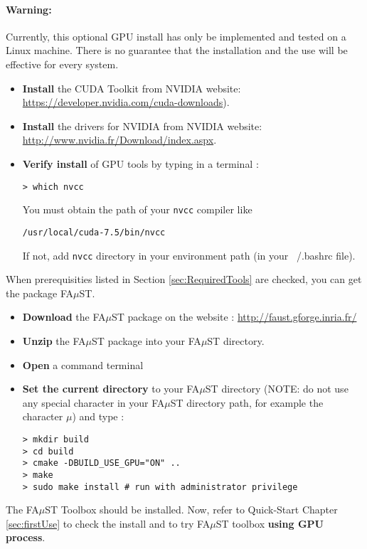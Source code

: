 \paragraph{Warning:} Currently, this optional GPU install has only be implemented and tested on a Linux machine. There is no guarantee that the installation and the use will be effective for every system.

\begin{itemize}
\item \textbf{Install} the CUDA Toolkit from NVIDIA website:\\
\url{https://developer.nvidia.com/cuda-downloads}).
\item \textbf{Install} the drivers for NVIDIA from NVIDIA website:\\ \url{http://www.nvidia.fr/Download/index.aspx}.
\item \textbf{Verify install} of GPU tools by typing in a terminal :
\lstset{style=customBash} 
\begin{lstlisting}
> which nvcc
\end{lstlisting}
You must obtain the path of your \texttt{nvcc} compiler like 
\begin{lstlisting}
/usr/local/cuda-7.5/bin/nvcc
\end{lstlisting}
If not, add \texttt{nvcc} directory in your environment path (in your ~/.bashrc file). 
\end{itemize}

When prerequisities listed in Section \ref{sec:RequiredTools} are checked, you can get the package FA$\mu$ST.
\begin{itemize}
\item \textbf{Download} the FA$\mu$ST package on the website :  \url{http://faust.gforge.inria.fr/}
\item \textbf{Unzip} the FA$\mu$ST package into your FA$\mu$ST directory.
\item \textbf{Open} a command terminal
\item \textbf{Set the current directory} to your FA$\mu$ST directory (NOTE: do not use any special character in your FA$\mu$ST directory path, for example the character $\mu$) and type :

\lstset{style=customBash}
\begin{lstlisting}
> mkdir build
> cd build
> cmake -DBUILD_USE_GPU="ON" ..
> make
> sudo make install # run with administrator privilege
\end{lstlisting}

\end{itemize}


The FA$\mu$ST Toolbox should be installed. Now, refer to Quick-Start Chapter \ref{sec:firstUse} to check the install and to try FA$\mu$ST toolbox \textbf{using GPU process}.

